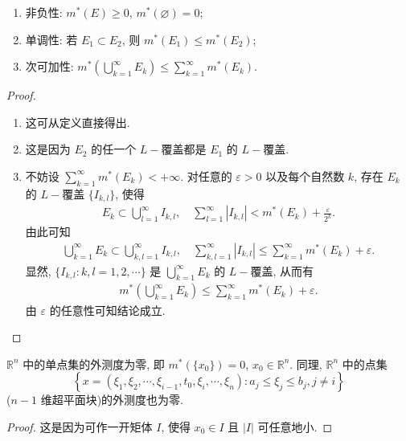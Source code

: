 \documentclass[../../main.tex]{subfiles}%
\begin{document}
\begin{theorem}\label{theorem:R^n 中点集的外测度性质}
\begin{enumerate}[(1)]
\item 非负性: \(m^*(E) \geqslant  0\), \(m^*(\varnothing)=0\);

\item 单调性: 若 \(E_1 \subset E_2\), 则 \(m^*(E_1) \leqslant  m^*(E_2)\);

\item 次可加性: \(m^*\left(\bigcup_{k = 1}^{\infty} E_k\right) \leqslant  \sum_{k = 1}^{\infty} m^*(E_k)\).
\end{enumerate}
\end{theorem}
\begin{proof}
\begin{enumerate}[(1)]
\item 这可从定义直接得出.

\item 这是因为 \(E_2\) 的任一个 \(L -\)覆盖都是 \(E_1\) 的 \(L -\)覆盖.

\item 不妨设 \(\sum_{k = 1}^{\infty} m^*(E_k) < + \infty\). 对任意的 \(\varepsilon > 0\) 以及每个自然数 \(k\), 存在 \(E_k\) 的 \(L -\)覆盖 \(\{I_{k, l}\}\), 使得
\begin{align*}
E_k \subset \bigcup_{l = 1}^{\infty} I_{k, l}, \quad \sum_{l = 1}^{\infty} |I_{k, l}| < m^*(E_k) + \frac{\varepsilon}{2^k}.
\end{align*}
由此可知
\begin{align*}
\bigcup_{k = 1}^{\infty} E_k \subset \bigcup_{k, l = 1}^{\infty} I_{k, l}, \quad \sum_{k, l = 1}^{\infty} |I_{k, l}| \leqslant  \sum_{k = 1}^{\infty} m^*(E_k) + \varepsilon.
\end{align*}
显然, \(\{I_{k, l} : k, l = 1, 2, \cdots\}\) 是 \(\bigcup_{k = 1}^{\infty} E_k\) 的 \(L -\)覆盖, 从而有
\begin{align*}
m^*\left(\bigcup_{k = 1}^{\infty} E_k\right) \leqslant  \sum_{k = 1}^{\infty} m^*(E_k) + \varepsilon.
\end{align*}
由 \(\varepsilon\) 的任意性可知结论成立.
\end{enumerate}
\end{proof}

\begin{proposition}\label{proposition-R^n中的单点集的外测度为零}
\(\mathbb{R}^n\) 中的单点集的外测度为零, 即 \(m^*(\{x_0\}) = 0\), \(x_0 \in \mathbb{R}^n\).  同理, \(\mathbb{R}^n\) 中的点集
\[
\left\{ x = (\xi_1, \xi_2, \cdots, \xi_{i - 1}, t_0, \xi_i, \cdots, \xi_n) : a_j \leqslant  \xi_j \leqslant  b_j, j \neq i \right\}
\]
(\(n - 1\) 维超平面块)的外测度也为零.
\end{proposition}
\begin{proof}
这是因为可作一开矩体 \(I\), 使得 \(x_0 \in I\) 且 \(|I|\) 可任意地小.
\end{proof}
\end{document}
